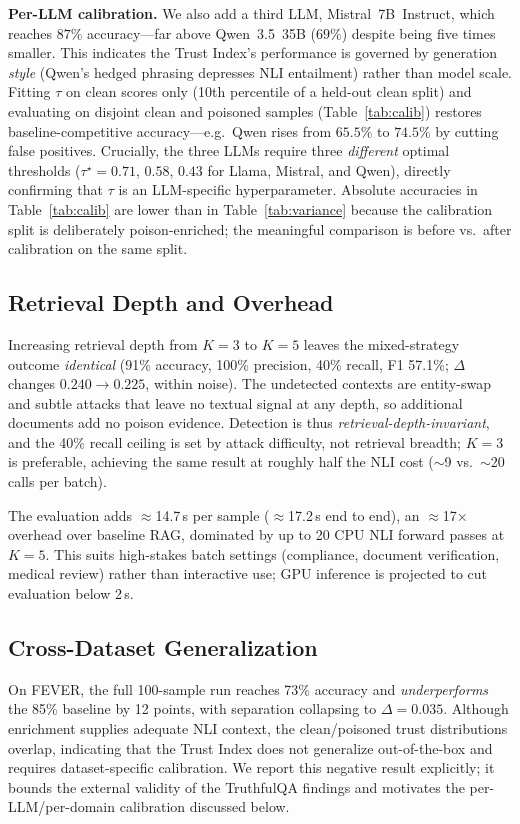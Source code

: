 \documentclass[conference]{IEEEtran}
\begin{document}
\textbf{Per-LLM calibration.} We also add a third LLM, Mistral~7B~Instruct, which reaches $87\%$ accuracy---far
above Qwen~3.5~35B ($69\%$) despite being five times smaller. This indicates the
Trust Index's performance is governed by generation \emph{style} (Qwen's hedged
phrasing depresses NLI entailment) rather than model scale. Fitting $\tau$ on
clean scores only (10th percentile of a held-out clean split) and evaluating on
disjoint clean and poisoned samples (Table~\ref{tab:calib}) restores
baseline-competitive accuracy---e.g.\ Qwen rises from $65.5\%$ to $74.5\%$ by
cutting false positives. Crucially, the three LLMs require three \emph{different}
optimal thresholds ($\tau^\star{=}0.71$, $0.58$, $0.43$ for Llama, Mistral, and
Qwen), directly confirming that $\tau$ is an LLM-specific hyperparameter.
Absolute accuracies in Table~\ref{tab:calib} are lower than in
Table~\ref{tab:variance} because the calibration split is deliberately
poison-enriched; the meaningful comparison is before vs.\ after calibration on
the same split.

\subsection{Retrieval Depth and Overhead}
Increasing retrieval depth from $K{=}3$ to $K{=}5$ leaves the mixed-strategy
outcome \emph{identical} (91\% accuracy, 100\% precision, 40\% recall, F1
57.1\%; $\Delta$ changes $0.240\!\to\!0.225$, within noise). The undetected
contexts are entity-swap and subtle attacks that leave no textual signal at any
depth, so additional documents add no poison evidence. Detection is thus
\emph{retrieval-depth-invariant}, and the 40\% recall ceiling is set by attack
difficulty, not retrieval breadth; $K{=}3$ is preferable, achieving the same
result at roughly half the NLI cost ($\sim$9 vs.\ $\sim$20 calls per batch).

The evaluation adds $\approx$14.7\,s per sample ($\approx$17.2\,s end to end),
an $\approx$17$\times$ overhead over baseline RAG, dominated by up to 20 CPU NLI
forward passes at $K{=}5$. This suits high-stakes batch settings (compliance,
document verification, medical review) rather than interactive use; GPU
inference is projected to cut evaluation below 2\,s.

\subsection{Cross-Dataset Generalization}
On FEVER, the full 100-sample run reaches 73\% accuracy and \emph{underperforms}
the 85\% baseline by 12 points, with separation collapsing to $\Delta{=}0.035$.
Although enrichment supplies adequate NLI context, the clean/poisoned trust
distributions overlap, indicating that the Trust Index does not generalize
out-of-the-box and requires dataset-specific calibration. We report this
negative result explicitly; it bounds the external validity of the TruthfulQA
findings and motivates the per-LLM/per-domain calibration discussed below.
\end{document}

